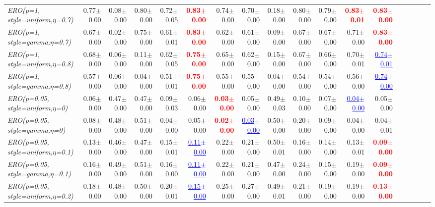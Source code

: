 \documentclass[nohyperref]{article}
\theoremstyle{plain}
\theoremstyle{definition}
\theoremstyle{remark}
\newcommand{\red}[1]{\textcolor{red}{\textbf{#1}}}
\newcommand{\blue}[1]{\textcolor{blue}{\underline{#1}}}
\begin{document}
\begin{table*}[!ht]
{\begin{tabular}{lrrrrrrrrrrrrrrrrr}
			{\it ERO(p=1, style=uniform,$\eta$=0.7)} & 0.77$\pm$0.00 & 0.08$\pm$0.00 & 0.80$\pm$0.00 & 0.72$\pm$0.05 & \red{0.83$\pm$0.00} & 0.74$\pm$0.00 & 0.70$\pm$0.00 & 0.18$\pm$0.00 & 0.80$\pm$0.00 & 0.79$\pm$0.00 & \red{0.83$\pm$0.01} & \red{0.83$\pm$0.00} \\
			{\it ERO(p=1, style=gamma,$\eta$=0.7)} & 0.67$\pm$0.00 & 0.02$\pm$0.00 & 0.75$\pm$0.00 & 0.61$\pm$0.01 & \red{0.83$\pm$0.00} & 0.62$\pm$0.00 & 0.61$\pm$0.00 & 0.09$\pm$0.00 & 0.67$\pm$0.00 & 0.67$\pm$0.00 & 0.71$\pm$0.00 & \red{0.83$\pm$0.00} \\
			{\it ERO(p=1, style=uniform,$\eta$=0.8)} & 0.68$\pm$0.00 & 0.06$\pm$0.00 & 0.11$\pm$0.00 & 0.62$\pm$0.05 & \red{0.75$\pm$0.00} & 0.65$\pm$0.00 & 0.62$\pm$0.00 & 0.15$\pm$0.00 & 0.67$\pm$0.00 & 0.66$\pm$0.00 & 0.70$\pm$0.01 & \blue{0.74$\pm$0.01} \\
			{\it ERO(p=1, style=gamma,$\eta$=0.8)} & 0.57$\pm$0.00 & 0.06$\pm$0.00 & 0.04$\pm$0.00 & 0.51$\pm$0.01 & \red{0.75$\pm$0.00} & 0.55$\pm$0.00 & 0.55$\pm$0.00 & 0.04$\pm$0.00 & 0.54$\pm$0.00 & 0.54$\pm$0.00 & 0.56$\pm$0.00 & \blue{0.74$\pm$0.00} \\
\midrule
{\it ERO(p=0.05, style=uniform,$\eta$=0)} & 0.06$\pm$0.00 & 0.47$\pm$0.00 & 0.47$\pm$0.00 & 0.09$\pm$0.03 & 0.06$\pm$0.00 & \red{0.03$\pm$0.00} & 0.05$\pm$0.00 & 0.49$\pm$0.03 & 0.10$\pm$0.00 & 0.07$\pm$0.00  & \blue{0.04$\pm$0.00} & 0.05$\pm$0.00 \\
			{\it ERO(p=0.05, style=gamma,$\eta$=0)} & 0.08$\pm$0.00 & 0.48$\pm$0.00 & 0.51$\pm$0.00 & 0.04$\pm$0.00 & 0.05$\pm$0.00 & \red{0.02$\pm$0.00} & \blue{0.03$\pm$0.00} & 0.50$\pm$0.00 & 0.20$\pm$0.00 & 0.09$\pm$0.00  & 0.04$\pm$0.00 & 0.04$\pm$0.01 \\
			{\it ERO(p=0.05, style=uniform,$\eta$=0.1)} & 0.13$\pm$0.00 & 0.46$\pm$0.00 & 0.47$\pm$0.00 & 0.15$\pm$0.01 & \blue{0.11$\pm$0.00} & 0.22$\pm$0.00 & 0.21$\pm$0.00 & 0.50$\pm$0.01 & 0.16$\pm$0.00 & 0.14$\pm$0.00  & 0.13$\pm$0.01 & \red{0.09$\pm$0.00} \\
			{\it ERO(p=0.05, style=gamma,$\eta$=0.1)} & 0.16$\pm$0.00 & 0.49$\pm$0.00 & 0.51$\pm$0.00 & 0.16$\pm$0.00 & \blue{0.11$\pm$0.00} & 0.22$\pm$0.00 & 0.21$\pm$0.00 & 0.47$\pm$0.00 & 0.24$\pm$0.00 & 0.15$\pm$0.00  & 0.19$\pm$0.00 & \red{0.09$\pm$0.00} \\
			{\it ERO(p=0.05, style=uniform,$\eta$=0.2)} & 0.18$\pm$0.00 & 0.48$\pm$0.00 & 0.50$\pm$0.00 & 0.20$\pm$0.01 & \blue{0.15$\pm$0.00} & 0.25$\pm$0.00 & 0.27$\pm$0.00 & 0.49$\pm$0.01 & 0.21$\pm$0.00 & 0.19$\pm$0.00  & 0.19$\pm$0.00 & \red{0.13$\pm$0.00} \\

\end{tabular}}
\end{table*}
\end{document}
